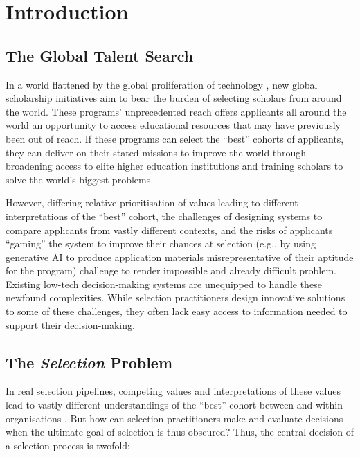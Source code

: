 

\chapter{\label{ch:intro}Introduction} 

\minitoc

\section{The Global Talent Search}
In a world flattened by the global proliferation of technology \cite{Friedman_2005}, new global scholarship initiatives aim to bear the burden of selecting scholars from around the world. These programs' unprecedented reach offers applicants all around the world an opportunity to access educational resources that may have previously been out of reach. If these programs can select the ``best'' cohorts of applicants, they can deliver on their stated missions to improve the world through broadening access to elite higher education institutions and training scholars to solve the world's biggest problems

However, differing relative prioritisation of values leading to different interpretations of the ``best'' cohort, the challenges of designing systems to compare applicants from vastly different contexts, and the risks of applicants ``gaming'' the system to improve their chances at selection (e.g., by using generative AI to produce application materials misrepresentative of their aptitude for the program) challenge to render impossible and already difficult problem. Existing low-tech decision-making systems are unequipped to handle these newfound complexities. While selection practitioners design innovative solutions to some of these challenges, they often lack easy access to information needed to support their decision-making.

\section{The \emph{Selection} Problem}
In real selection pipelines, competing values and interpretations of these values lead to vastly different understandings of the ``best'' cohort between and within organisations \cite{zimmerman_research_2014}. But how can selection practitioners make and evaluate decisions when the ultimate goal of selection is thus obscured? Thus, the central decision of a selection process is twofold: 

